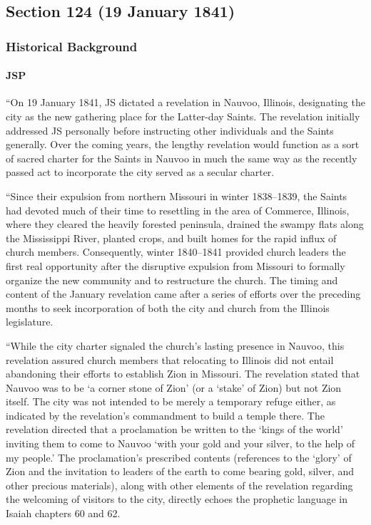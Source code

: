 \subsection{Section 124 (19 January 1841)}
	\label{DC124}
	
	\subsubsection{Historical Background}
		\label{DC124-HB}
		
		\paragraph{JSP}
		
			``On 19 January 1841, JS dictated a revelation in Nauvoo, Illinois, designating the city as the new gathering place for the Latter-day Saints. The revelation initially addressed JS personally before instructing other individuals and the Saints generally. Over the coming years, the lengthy revelation would function as a sort of sacred charter for the Saints in Nauvoo in much the same way as the recently passed act to incorporate the city served as a secular charter.

			``Since their expulsion from northern Missouri in winter 1838--1839, the Saints had devoted much of their time to resettling in the area of Commerce, Illinois, where they cleared the heavily forested peninsula, drained the swampy flats along the Mississippi River, planted crops, and built homes for the rapid influx of church members. Consequently, winter 1840--1841 provided church leaders the first real opportunity after the disruptive expulsion from Missouri to formally organize the new community and to restructure the church. The timing and content of the January revelation came after a series of efforts over the preceding months to seek incorporation of both the city and church from the Illinois legislature.

			``While the city charter signaled the church's lasting presence in Nauvoo, this revelation assured church members that relocating to Illinois did not entail abandoning their efforts to establish Zion in Missouri. The revelation stated that Nauvoo was to be `a corner stone of Zion' (or a `stake' of Zion) but not Zion itself. The city was not intended to be merely a temporary refuge either, as indicated by the revelation's commandment to build a temple there. The revelation directed that a proclamation be written to the `kings of the world' inviting them to come to Nauvoo `with your gold and your silver, to the help of my people.' The proclamation's prescribed contents (references to the `glory' of Zion and the invitation to leaders of the earth to come bearing gold, silver, and other precious materials), along with other elements of the revelation regarding the welcoming of visitors to the city, directly echoes the prophetic language in Isaiah chapters 60 and 62.

